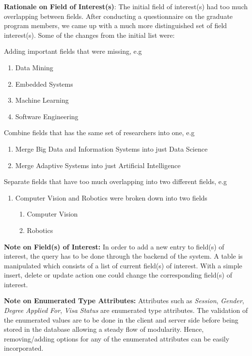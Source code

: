 \documentclass[fontsize=12pt,paper=letter,twoside]{scrartcl}
\begin{document}
\smallskip
\noindent \textbf{Rationale on Field of Interest(s)}: The initial field of interest(s) had too much overlapping between fields. After conducting a questionnaire on the graduate program members, we came up with a much more distinguished set of field interest(s). Some of the changes from the initial list were:
\begin{mylist}
\item Adding important fields that were missing, e.g
\begin{enumerate}
\item Data Mining
\item Embedded Systems
\item Machine Learning
\item Software Engineering
\end{enumerate}
\item Combine fields that has the same set of researchers into one, e.g
\begin{enumerate}
\item Merge Big Data and Information Systems into just Data Science
\item Merge Adaptive Systems into just Artificial Intelligence
\end{enumerate}
\item Separate fields that have too much overlapping into two different fields, e.g
\begin{enumerate}
\item Computer Vision and Robotics were broken down into two fields
\begin{enumerate}
\item Computer Vision
\item Robotics
\end{enumerate}
\end{enumerate}
\end{mylist}

\smallskip
\noindent \textbf{Note on Field(s) of Interest:} In order to add a new entry to field(s) of interest, the query has to be done through the backend of the system. A table is manipulated which consists of a list of current field(s) of interest. With a simple insert, delete or update action one could change the corresponding field(s) of interest.

\smallskip
\noindent \textbf{Note on Enumerated Type Attributes:} Attributes such as \emph{Session}, \emph{Gender}, \emph{Degree Applied For}, \emph{Visa Status} are enumerated type attributes. The validation of the enumerated values are to be done in the client and server side before being stored in the database allowing a steady flow of modularity. Hence, removing/adding options for any of the enumerated attributes can be easily incorporated.
\end{document}
